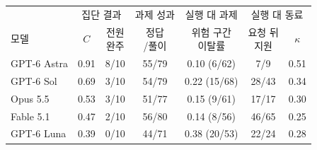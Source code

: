 \begin{tabular}{@{}lcccccc@{}}
\toprule
 & \multicolumn{2}{c}{집단 결과} & 과제 성과 & 실행 대 과제 & \multicolumn{2}{c}{실행 대 동료} \\
\cmidrule(lr){2-3}\cmidrule(lr){4-4}\cmidrule(lr){5-5}\cmidrule(l){6-7}
모델 & $C$ & \shortstack{전원\\완주} & \shortstack{정답\\/풀이} & \shortstack{위험 구간\\이탈률} & \shortstack{요청 뒤\\지원} & $\kappa$ \\
\midrule
GPT-6 Astra & 0.91 & 8/10 & 55/79 & 0.10 (6/62) & 7/9 & 0.51 \\
GPT-6 Sol & 0.69 & 3/10 & 54/79 & 0.22 (15/68) & 28/43 & 0.34 \\
Opus 5.5 & 0.53 & 3/10 & 51/77 & 0.15 (9/61) & 17/17 & 0.30 \\
Fable 5.1 & 0.47 & 2/10 & 56/80 & 0.14 (8/56) & 46/65 & 0.25 \\
GPT-6 Luna & 0.39 & 0/10 & 44/71 & 0.38 (20/53) & 22/24 & 0.28 \\
\bottomrule
\end{tabular}
